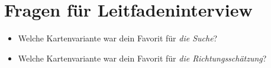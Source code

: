 \begin{appendices}
    \begin{center}
    \end{center}
    \clearpage
    
    \section*{Fragen für Leitfadeninterview}
    \vspace{2em}
    \begin{itemize}
        \item Welche Kartenvariante war dein Favorit für \emph{die Suche}?
        
        \item Welche Kartenvariante war dein Favorit für \emph{die Richtungsschätzung}?
        

\end{itemize}
\end{appendices}

